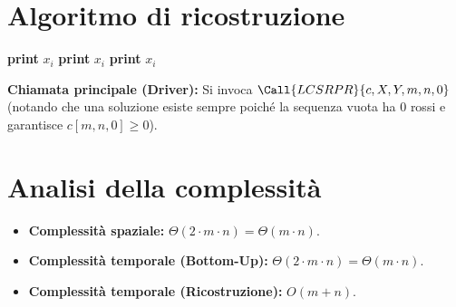 \section{Algoritmo di ricostruzione}
\begin{algorithm}[htbp]
\caption{Ricostruzione della sequenza LCS con numero pari di rossi}
\begin{algorithmic}[1]
        \State \Return
    \Else
                \State {}
            \Else
                \State {}
            \EndIf
        \Else
                \State {}
                \State \textbf{print} $x_i$
            \Else
                        \State {}
                        \State \textbf{print} $x_i$
                    \Else
                        \State {}
                    \EndIf
                \Else
                    \State {}
                    \State \textbf{print} $x_i$
                \EndIf
            \EndIf
        \EndIf
    \EndIf
\EndProcedure
\end{algorithmic}
\end{algorithm}

\noindent
\textbf{Chiamata principale (Driver):} Si invoca $\Call{LCSRPR}{c, X, Y, m, n, 0}$ (notando che una soluzione esiste sempre poiché la sequenza vuota ha $0$ rossi e garantisce $c[m, n, 0] \ge 0$).

\section{Analisi della complessità}
\begin{itemize}
    \item \textbf{Complessità spaziale:} $\Theta(2 \cdot m \cdot n) = \Theta(m \cdot n)$.
    \item \textbf{Complessità temporale (Bottom-Up):} $\Theta(2 \cdot m \cdot n) = \Theta(m \cdot n)$.
    \item \textbf{Complessità temporale (Ricostruzione):} $O(m + n)$.
\end{itemize}